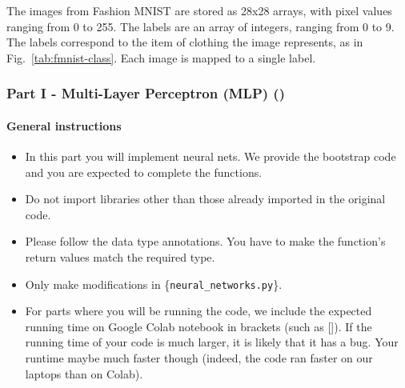 The images from Fashion MNIST are stored as 28x28 arrays, with pixel values ranging from 0 to 255. The labels are an array of integers, ranging from 0 to 9. The labels correspond to the item of clothing the image represents, as in Fig.~\ref{tab:fmnist-class}. Each image is mapped to a single label.

\newpage
\subsubsection*{Part I - Multi-Layer Perceptron (MLP) ()}

\paragraph{General instructions}
\begin{itemize}
    \item In this part you will implement neural nets. We provide the bootstrap code and you are expected to complete the functions.
    \item Do not import libraries other than those already imported in the original code. 
    \item Please follow the data type annotations. You have to make the function’s return values match the required type.
    \item Only make modifications in \{\texttt{neural\_networks.py}\}.
    \item For parts where you will be running the code, we include the expected running time on Google Colab notebook in brackets (such as []). If the running time of your code is much larger, it is likely that it has a bug. Your runtime maybe much faster though (indeed, the code ran faster on our laptops than on Colab).
\end{itemize}


